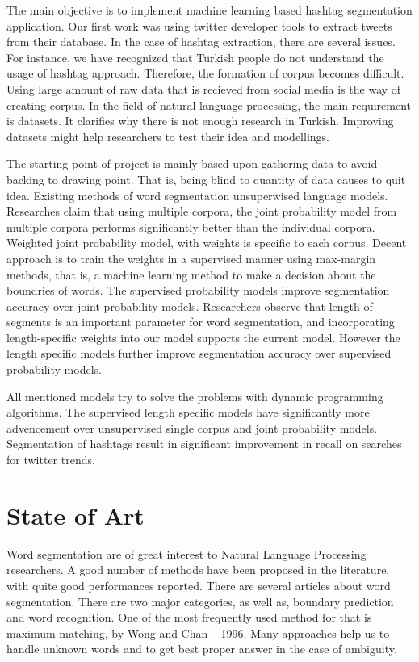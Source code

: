 \documentclass[12pt]{comjnl}
\begin{document}
The main objective is to implement machine learning based hashtag segmentation application.
Our first work was using twitter developer tools to 
extract tweets from their database. In the case of hashtag extraction, there are several issues. For instance,
we have recognized that Turkish people do not understand the usage of hashtag approach.
Therefore, the formation of corpus becomes difficult. Using large amount of raw data that 
is recieved from social media is the way of creating corpus. In the field of natural language 
processing, the main requirement is datasets. It clarifies why there is not enough
research in Turkish. Improving datasets might help researchers to test their idea and
modellings. 

The starting point of project is mainly based upon gathering data to avoid
backing to drawing point. That is, being blind to quantity of data causes to quit idea.
Existing methods of word segmentation unsuperwised language models. Researches claim that
using multiple corpora, the joint probability model from multiple corpora performs significantly 
better than the individual corpora. Weighted joint probability model, with weights is specific 
to each corpus. Decent approach is to train the weights in a supervised manner using max-margin 
methods, that is, a machine learning method to make a decision about the boundries of words.
The supervised probability models improve segmentation accuracy over joint probability models. 
Researchers observe that length of segments is an important parameter for word segmentation, and 
incorporating length-specific weights into our model supports the current model.
However the length specific models further improve segmentation accuracy over supervised 
probability models.

All mentioned models try to solve the problems with dynamic programming algorithms. The supervised length specific models have significantly more advencement over unsupervised single corpus and joint probability models. Segmentation of hashtags result in significant improvement in recall on searches for twitter trends.

\section{State of Art}

Word segmentation are of great interest to Natural Language Processing researchers. 
A good number of methods have been proposed in the literature, with quite good 
performances reported. There are several articles about word segmentation. 
There are two major categories, as well as, boundary prediction and word 
recognition. One of the most frequently used method
for that is maximum matching, by Wong and Chan – 1996. Many approaches help us to handle
unknown words and to get best proper answer in the case of ambiguity.
\end{document}
